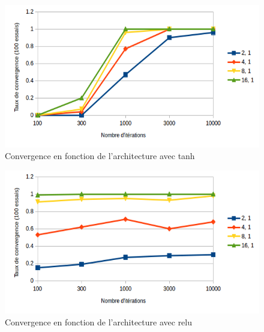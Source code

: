 \documentclass{report}
\begin{document}
\begin{figure}[!h]
\begin{center}
\includegraphics[scale=0.6]{images/xor_architecture_tanh.png}
\caption{Convergence en fonction de l'architecture avec tanh}
\label{xor_architecture_tanh}
\end{center}
\end{figure}

\begin{figure}[!h]
\begin{center}
\includegraphics[scale=0.6]{images/xor_architecture_relu.png}
\caption{Convergence en fonction de l'architecture avec relu}
\label{xor_architecture_relu}
\end{center}
\end{figure}
\end{document}
